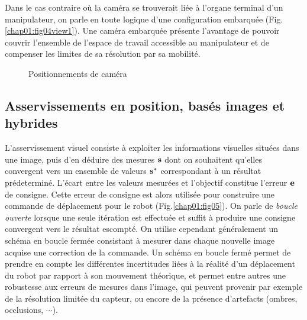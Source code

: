Dans le cas contraire o\`u la cam\'era se trouverait li\'ee \`a l'organe 
terminal d'un manipulateur, on parle en toute logique d'une configuration 
embarquée (Fig.\ref{chap01:fig04view1}). Une cam\'era embarqu\'ee pr\'esente 
l'avantage de pouvoir couvrir l'en\-semble de l'espace de travail accessible au 
manipulateur et de compenser les limites de sa r\'esolution par sa mobilit\'e.

\begin{figure}[htp]
  \centering
   \hfill
    \caption{\footnotesize{Positionnements de caméra}}
\label{chap01:fig04}
\end{figure}

\subsection{Asservissements en position, basés images et hybrides} 
\label{chap1-1-1}

L'asservissement visuel consiste \`a exploiter les informations visuelles 
situ\'ees dans une image, puis d'en d\'eduire des mesures ${\bf s}$ dont on 
souhaitent qu'elles convergent vers un ensemble de valeurs ${\bf s}^*$ 
correspondant \`a un r\'esultat pr\'edetermin\'e. L'\'ecart entre les valeurs 
mesur\'ees et l'objectif constitue l'erreur ${\bf e}$ de consigne. Cette erreur 
de consigne est alors utilis\'ee pour construire une commande de d\'eplacement 
pour le robot (Fig.\ref{chap01:fig05}). On parle de {\it boucle ouverte} lorsque 
une seule it\'eration est effectu\'ee et suffit \`a produire une consigne 
convergent vers le r\'esultat escompt\'e. On utilise cependant g\'en\'eralement 
un sch\'ema en boucle ferm\'ee consistant \`a mesurer dans chaque nouvelle image 
acquise une correction de la commande. Un sch\'ema en boucle ferm\'e permet de 
prendre en compte les diff\'erentes incertitudes li\'ees \`a la r\'ealit\'e d'un 
d\'eplacement du robot par rapport \`a son mouvement th\'eorique, et permet 
entre autres une robustesse aux erreurs de mesures dans l'image, qui peuvent 
provenir par exemple de la r\'esolution limit\'ee du capteur, ou encore de la 
pr\'esence d'artefacts (ombres, occlusions, $\cdots$).

